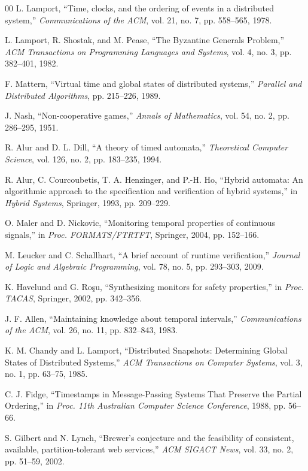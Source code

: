 \documentclass[conference]{IEEEtran}
\begin{document}
\begin{thebibliography}{00}
 L. Lamport, ``Time, clocks, and the ordering of events in a distributed system,'' \textit{Communications of the ACM}, vol. 21, no. 7, pp. 558--565, 1978.

 L. Lamport, R. Shostak, and M. Pease, ``The Byzantine Generals Problem,'' \textit{ACM Transactions on Programming Languages and Systems}, vol. 4, no. 3, pp. 382--401, 1982.

 F. Mattern, ``Virtual time and global states of distributed systems,'' \textit{Parallel and Distributed Algorithms}, pp. 215--226, 1989.

 J. Nash, ``Non-cooperative games,'' \textit{Annals of Mathematics}, vol. 54, no. 2, pp. 286--295, 1951.

 R. Alur and D. L. Dill, ``A theory of timed automata,'' \textit{Theoretical Computer Science}, vol. 126, no. 2, pp. 183--235, 1994.

 R. Alur, C. Courcoubetis, T. A. Henzinger, and P.-H. Ho, ``Hybrid automata: An algorithmic approach to the specification and verification of hybrid systems,'' in \textit{Hybrid Systems}, Springer, 1993, pp. 209--229.

 O. Maler and D. Nickovic, ``Monitoring temporal properties of continuous signals,'' in \textit{Proc. FORMATS/FTRTFT}, Springer, 2004, pp. 152--166.

 M. Leucker and C. Schallhart, ``A brief account of runtime verification,'' \textit{Journal of Logic and Algebraic Programming}, vol. 78, no. 5, pp. 293--303, 2009.

 K. Havelund and G. Ro\c{s}u, ``Synthesizing monitors for safety properties,'' in \textit{Proc. TACAS}, Springer, 2002, pp. 342--356.

 J. F. Allen, ``Maintaining knowledge about temporal intervals,'' \textit{Communications of the ACM}, vol. 26, no. 11, pp. 832--843, 1983.

 K. M. Chandy and L. Lamport, ``Distributed Snapshots: Determining Global States of Distributed Systems,'' \textit{ACM Transactions on Computer Systems}, vol. 3, no. 1, pp. 63--75, 1985.

 C. J. Fidge, ``Timestamps in Message-Passing Systems That Preserve the Partial Ordering,'' in \textit{Proc. 11th Australian Computer Science Conference}, 1988, pp. 56--66.

 S. Gilbert and N. Lynch, ``Brewer's conjecture and the feasibility of consistent, available, partition-tolerant web services,'' \textit{ACM SIGACT News}, vol. 33, no. 2, pp. 51--59, 2002.

\end{thebibliography}
\end{document}
